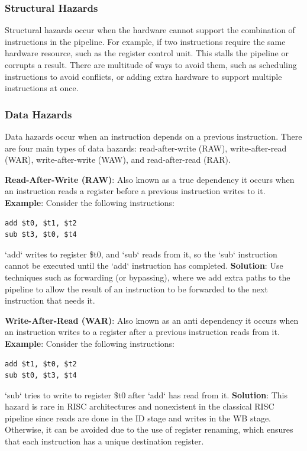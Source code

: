 \subsubsection {Structural Hazards}\label{sec:structural_hazards}
Structural hazards occur when the hardware cannot support the combination of instructions in the pipeline. For example, if two instructions require the same hardware resource, such as the register control unit.
This stalls the pipeline or corrupts a result.
There are multitude of ways to avoid them, such as scheduling instructions to avoid conflicts, or adding extra hardware to support multiple instructions at once\cite{proebsting1994detecting}.
\subsubsection {Data Hazards}\label{sec:data_hazards}
Data hazards occur when an instruction depends on a previous instruction. There are four main types of data hazards: read-after-write (RAW), write-after-read (WAR), write-after-write (WAW), and read-after-read (RAR).

\textbf{Read-After-Write (RAW)}: Also known as a true dependency it occurs when an instruction reads a register before a previous instruction writes to it.\newline
\textbf{Example}: Consider the following instructions:
\begin{verbatim}
add $t0, $t1, $t2
sub $t3, $t0, $t4   
\end{verbatim}
`add` writes to register \$t0, and `sub` reads from it, so the `sub` instruction cannot be executed until the `add` instruction has completed.\newline
\textbf{Solution}: Use techniques such as forwarding (or bypassing), where we add extra paths to the pipeline to allow the result of an instruction to be forwarded to the next instruction that needs it.

\textbf{Write-After-Read (WAR)}: Also known as an anti dependency it occurs when an instruction writes to a register after a previous instruction reads from it.\newline
\textbf{Example}: Consider the following instructions:
\begin{verbatim}
add $t1, $t0, $t2
sub $t0, $t3, $t4
\end{verbatim}
`sub` tries to write to register \$t0 after `add` has read from it.
\textbf{Solution}: This hazard is rare in RISC architectures and nonexistent in the classical RISC pipeline since reads are done in the ID stage and writes in the WB stage. Otherwise, it can be avoided due to the use of register renaming, which ensures that each instruction has a unique destination register. 

